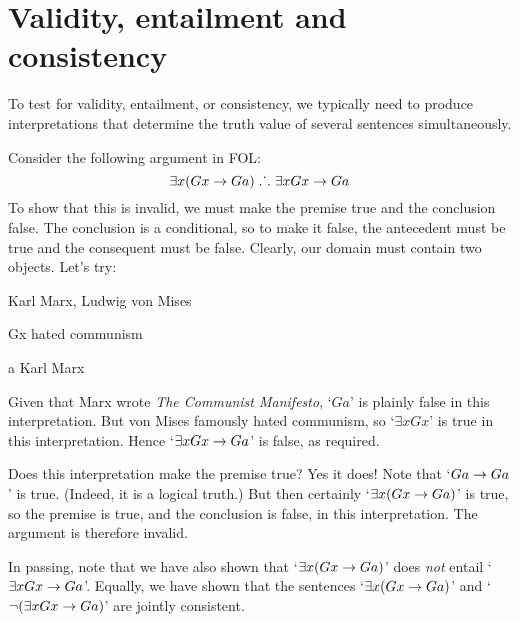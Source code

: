 
\section{Validity, entailment and consistency}
To test for validity, entailment, or consistency, we typically need to produce interpretations that determine the truth value of several sentences simultaneously. 

Consider the following argument in FOL:
$$\exists x(Gx \rightarrow Ga) \mathrel{\ldotp\dot{}\,\ldotp} \exists x Gx \rightarrow Ga$$
To show that this is invalid, we must make the premise true and the conclusion false. The conclusion is a conditional, so to make it false, the antecedent must be true and the consequent must be false. Clearly, our domain must contain two objects. Let's try:
	\begin{ekey}
		\item[\text{domain}] Karl Marx, Ludwig von Mises
		\item[Gx]  hated communism
		\item[a] Karl Marx
	\end{ekey}
Given that Marx wrote \emph{The Communist Manifesto}, `$Ga$' is plainly false in this interpretation. But von Mises famously hated communism, so `$\exists x Gx$' is true in this interpretation. Hence `$\exists x Gx \rightarrow Ga$' is false, as required. 

Does this interpretation make the premise true? Yes it does! Note that `$Ga \rightarrow Ga$' is true. (Indeed, it is a logical truth.) But then certainly `$\exists x (Gx \rightarrow Ga)$' is true, so the premise is true, and the conclusion is false, in this interpretation. The argument is therefore invalid. 

In passing, note that we have also shown that `$\exists x(Gx \rightarrow Ga)$' does \emph{not} entail `$\exists x Gx \rightarrow Ga$'. Equally, we have shown that the sentences `$\exists x (Gx \rightarrow Ga)$' and `$\neg (\exists x Gx \rightarrow Ga)$' are jointly consistent.

